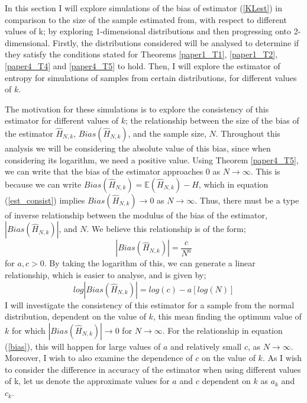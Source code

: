 \documentclass{article}
\begin{document}
In this section I will explore simulations of the bias of estimator (\ref{KLest}) in comparison to the size of the sample estimated from, with respect to different values of k; by exploring 1-dimensional distributions and then progressing onto 2-dimensional. Firstly, the distributions considered will be analysed to determine if they satisfy the conditions stated for Theorems \ref{paper1_T1}, \ref{paper1_T2}, \ref{paper4_T4} and \ref{paper4_T5} to hold. Then, I will explore the estimator of entropy for simulations of samples  from certain distributions, for different values of $k$.

The motivation for these simulations is to explore the consistency of this estimator for different values of $k$; the relationship between the size of the bias of the estimator $\hat{H}_{N, k}$, $Bias(\hat{H}_{N, k})$,  and the sample size, $N$. Throughout this analysis we will be considering the absolute value of this bias, since when considering its logarithm, we need a positive value. Using Theorem \ref{paper4_T5}, we can write that the bias of the estimator approaches 0 as $N \to \infty$. This is because we can write $Bias(\hat{H}_{N, k} ) = \mathbb{E}(\hat{H}_{N, k}) - H$, which in equation (\ref{est_consist}) implies $Bias(\hat{H}_{N, k}) \to 0$ as $N \to \infty$. Thus, there must be a type of inverse relationship between the modulus of the bias of the estimator, $|Bias(\hat{H}_{N, k})|$, and $N$. We believe this relationship is of the form;
\begin{equation} \label{bias}
|Bias(\hat{H}_{N, k})| = \frac{c}{N^a}
\end{equation}
for $a, c > 0$. By taking the logarithm of this, we can generate a linear relationship, which is easier to analyse, and is given by;
\begin{equation} \label{logbias}
log|Bias(\hat{H}_{N, k})| = log(c) - a [log(N)]
\end{equation}
I will investigate the consistency of this estimator for a sample from the normal distribution, dependent on the value of $k$, this mean finding the optimum value of $k$ for which $|Bias(\hat{H}_{N, k})| \to 0$ for $N \to \infty$. For the relationship in equation (\ref{bias}), this will happen for large values of $a$ and relatively small $c$, as $N \to \infty$. Moreover, I wish to also examine the dependence of $c$ on the value of $k$. As I wish to consider the difference in accuracy of the estimator when using different values of k, let us denote the approximate values for $a$ and $c$ dependent on $k$ as $a_{k}$ and $c_{k}$.
\end{document}
